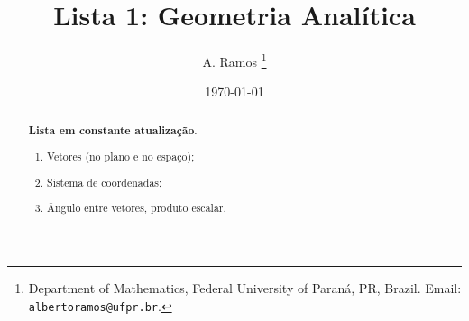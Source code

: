 \documentclass{article}
\theoremstyle{plain}
\theoremstyle{definition}
\theoremstyle{remark}
\begin{document}
\title{Lista 1: Geometria Analítica}

\author{
A. Ramos \thanks{Department of Mathematics,
    Federal University of Paraná, PR, Brazil.
    Email: {\tt albertoramos@ufpr.br}.}
}

\date{\today}
 
\maketitle

\begin{abstract}
{\bf Lista em constante atualização}.
 \begin{enumerate}
 \item Vetores (no plano e no espaço);
 \item Sistema de coordenadas; 
 \item Ângulo entre vetores, produto escalar.
 \end{enumerate}
\end{abstract}
\end{document}
